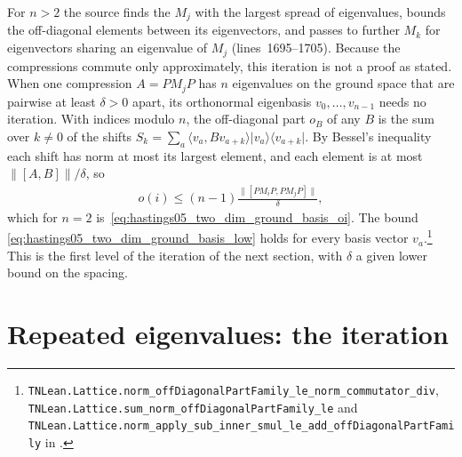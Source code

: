 \documentclass{article}
\providecommand{\leanid}[1]{\nolinkurl{#1}}
\begin{document}
For $n>2$ the source finds the $M_j$ with the largest spread of eigenvalues,
bounds the off-diagonal elements between its eigenvectors, and passes to
further $M_k$ for eigenvectors sharing an eigenvalue of $M_j$
(lines~1695--1705). Because the compressions commute only approximately, this
iteration is not a proof as stated. When one compression $A=PM_jP$ has $n$
eigenvalues on the ground space that are pairwise at least $\delta>0$ apart,
its orthonormal eigenbasis $v_0,\dots,v_{n-1}$ needs no iteration. With indices
modulo $n$, the off-diagonal part $o_B$ of any $B$ is the sum over $k\ne0$ of
the shifts
$S_k=\sum_a\langle v_a,Bv_{a+k}\rangle\lvert v_a\rangle\langle v_{a+k}\rvert$.
By Bessel's inequality each shift has norm at most its largest element, and
each element is at most $\lVert[A,B]\rVert/\delta$, so
\begin{align}
  o(i)\le(n-1)\frac{\lVert[PM_iP,PM_jP]\rVert}{\delta},
  \label{eq:hastings05_two_dim_ground_basis_simple}
\end{align}
which for $n=2$ is~\eqref{eq:hastings05_two_dim_ground_basis_oi}. The bound
\eqref{eq:hastings05_two_dim_ground_basis_low} holds for every basis vector
$v_a$.\footnote{\leanid{TNLean.Lattice.norm_offDiagonalPartFamily_le_norm_commutator_div},
    \leanid{TNLean.Lattice.sum_norm_offDiagonalPartFamily_le} and
    \leanid{TNLean.Lattice.norm_apply_sub_inner_smul_le_add_offDiagonalPartFamily}
    in .}
This is the first level of the iteration of the next section, with $\delta$ a
given lower bound on the spacing.

\section{Repeated eigenvalues: the iteration}
\end{document}
